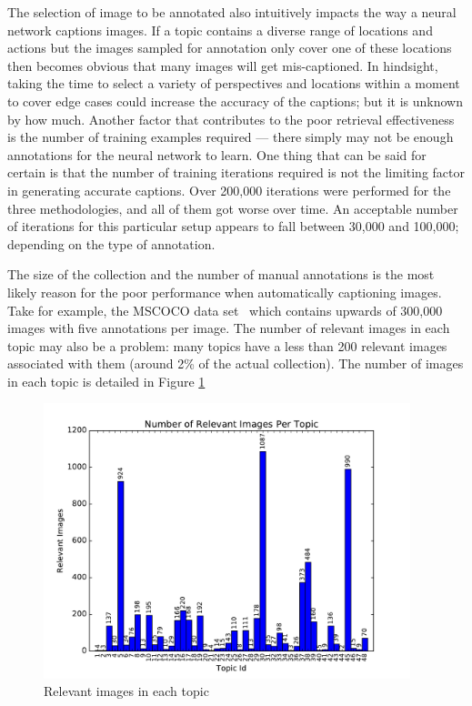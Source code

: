 The selection of image to be annotated also intuitively impacts the way a neural network captions images. If a topic contains a diverse range of locations and actions but the images sampled for annotation only cover one of these locations then becomes obvious that many images will get mis-captioned. In hindsight, taking the time to select a variety of perspectives and locations within a moment to cover edge cases could increase the accuracy of the captions; but it is unknown by how much. Another factor that contributes to the poor retrieval effectiveness is the number of training examples required --- there simply may not be enough annotations for the neural network to learn. One thing that can be said for certain is that the number of training iterations required is not the limiting factor in generating accurate captions. Over 200,000 iterations were performed for the three methodologies, and all of them got worse over time. An acceptable number of iterations for this particular setup appears to fall between 30,000 and 100,000; depending on the type of annotation.

The size of the collection and the number of manual annotations is the most likely reason for the poor performance when automatically captioning images. Take for example, the MSCOCO data set~\cite{lin2014microsoft} which contains upwards of 300,000 images with five annotations per image. The number of relevant images in each topic may also be a problem: many topics have a less than 200 relevant images associated with them (around 2\% of the actual collection). The number of images in each topic is detailed in Figure \ref{fig:relevant-images}

\begin{figure}[h]
    \centering
    \includegraphics[width=0.95\textwidth]{graphs/relevant-images}
    \caption{Relevant images in each topic}
    \label{fig:relevant-images}
\end{figure}

